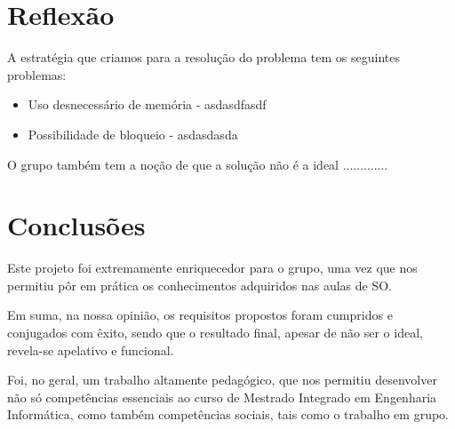 \documentclass[a4paper]{article}
\begin{document}



\section{Reflexão}
\label{sec:reflexao}

A estratégia que criamos para a resolução do problema tem os seguintes problemas:

\begin{itemize}
  \item{Uso desnecessário de memória - asdasdfasdf}
  \item{Possibilidade de bloqueio - asdasdasda}
\end{itemize}

O grupo também tem a noção de que a solução não é a ideal .............


\section{Conclusões}
\label{sec:conclusao}

Este projeto foi extremamente enriquecedor para o grupo, uma vez que nos permitiu pôr em prática os conhecimentos adquiridos nas aulas de SO.

Em suma, na nossa opinião, os requisitos propostos foram cumpridos e conjugados com êxito, sendo que o resultado final, apesar de não ser o ideal, revela-se apelativo e funcional.

Foi, no geral, um trabalho  altamente pedagógico, que nos permitiu desenvolver não só competências essenciais ao curso de Mestrado Integrado em Engenharia Informática, como também competências sociais, tais como o trabalho em grupo.
\end{document}
